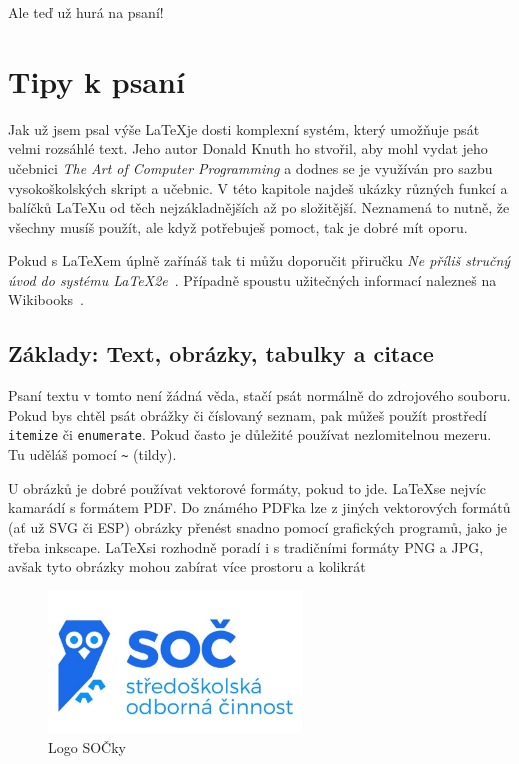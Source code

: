 \documentclass[12pt, a4paper,
 twoside,        %
 openright
]{report}
\begin{document}
Ale teď už hurá na psaní!

\chapter{Tipy k psaní}

Jak už jsem psal výše \LaTeX je dosti komplexní systém, který umožňuje psát velmi rozsáhlé text. Jeho autor Donald Knuth ho stvořil, aby mohl vydat jeho učebnici \emph{The Art of Computer Programming} a dodnes se je využíván pro sazbu vysokoškolských skript a učebnic. V této kapitole najdeš ukázky různých funkcí a balíčků \LaTeX u od těch nejzákladnějších až po složitější. Neznamená to nutně, že všechny musíš použít, ale když potřebuješ pomoct, tak je dobré mít oporu. 

Pokud s \LaTeX em úplně zařínáš tak ti můžu doporučit přiručku \emph{Ne příliš stručný úvod do systému \LaTeX2e}~\cite{LaTeXprirucka}. Případně spoustu užitečných informací nalezneš na Wikibooks~\cite{wikibooksLaTeX}.


\section[Základy]{Základy: Text, obrázky, tabulky a citace}
Psaní textu v tomto není žádná věda, stačí psát normálně do zdrojového souboru. Pokud bys chtěl psát obrážky či číslovaný seznam, pak můžeš použít prostředí \texttt{itemize} či \texttt{enumerate}. Pokud často je důležité používat nezlomitelnou mezeru. Tu uděláš pomocí \verb|~| (tildy).

U obrázků je dobré používat vektorové formáty, pokud to jde. \LaTeX se nejvíc kamarádí s formátem PDF. Do známého PDFka lze z jiných vektorových formátů (ať už SVG či ESP) obrázky přenést snadno pomocí grafických programů, jako je třeba inkscape. \LaTeX si rozhodně poradí i s tradičními formáty PNG a JPG, avšak tyto obrázky mohou zabírat více prostoru a kolikrát

\begin{figure}[h]
    \centering
    \includegraphics[width=0.6\textwidth]{imgs/soc-logo.jpg}
    \caption{Logo SOČky}
    \label{fig:logoSOC}
\end{figure}
\end{document}
